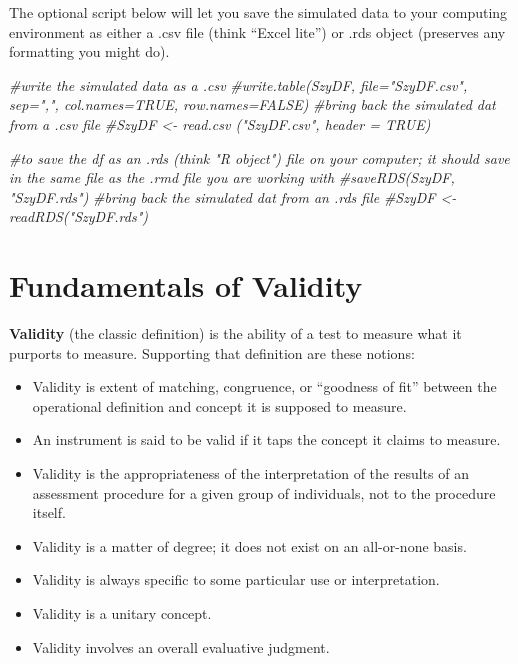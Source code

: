 \documentclass[
  english,
]{book}
\newenvironment{Shaded}{\begin{snugshade}}{\end{snugshade}}
\newcommand{\CommentTok}[1]{\textcolor[rgb]{0.56,0.35,0.01}{\textit{#1}}}
\providecommand{\tightlist}{%
  \setlength{\itemsep}{0pt}\setlength{\parskip}{0pt}}
\begin{document}
The optional script below will let you save the simulated data to your computing environment as either a .csv file (think ``Excel lite'') or .rds object (preserves any formatting you might do).

\begin{Shaded}
\begin{Highlighting}[]
\CommentTok{\#write the simulated data  as a .csv}
\CommentTok{\#write.table(SzyDF, file="SzyDF.csv", sep=",", col.names=TRUE, row.names=FALSE)}
\CommentTok{\#bring back the simulated dat from a .csv file}
\CommentTok{\#SzyDF \textless{}{-} read.csv ("SzyDF.csv", header = TRUE)}
\end{Highlighting}
\end{Shaded}

\begin{Shaded}
\begin{Highlighting}[]
\CommentTok{\#to save the df as an .rds (think "R object") file on your computer; it should save in the same file as the .rmd file you are working with}
\CommentTok{\#saveRDS(SzyDF, "SzyDF.rds")}
\CommentTok{\#bring back the simulated dat from an .rds file}
\CommentTok{\#SzyDF \textless{}{-} readRDS("SzyDF.rds")}
\end{Highlighting}
\end{Shaded}

\hypertarget{fundamentals-of-validity}{%
\section{Fundamentals of Validity}\label{fundamentals-of-validity}}

\textbf{Validity} (the classic definition) is the ability of a test to measure what it purports to measure. Supporting that definition are these notions:

\begin{itemize}
\tightlist
\item
  Validity is extent of matching, congruence, or ``goodness of fit'' between the operational definition and concept it is supposed to measure.
\item
  An instrument is said to be valid if it taps the concept it claims to measure.
\item
  Validity is the appropriateness of the interpretation of the results of an assessment procedure for a given group of individuals, not to the procedure itself.
\item
  Validity is a matter of degree; it does not exist on an all-or-none basis.
\item
  Validity is always specific to some particular use or interpretation.
\item
  Validity is a unitary concept.
\item
  Validity involves an overall evaluative judgment.
\end{itemize}
\end{document}
